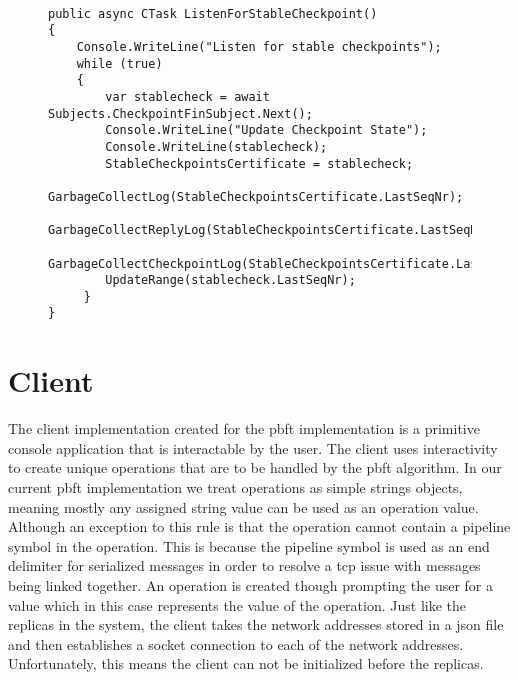 \begin{figure}[H]
	\centering
	\begin{lstlisting}[label = code:ListenForCheckpoint, caption=Listener for valid checkpoint, captionpos = b, basicstyle=\scriptsize]

public async CTask ListenForStableCheckpoint()
{
    Console.WriteLine("Listen for stable checkpoints");
    while (true)
    {
    	var stablecheck = await Subjects.CheckpointFinSubject.Next();
        Console.WriteLine("Update Checkpoint State");
        Console.WriteLine(stablecheck);
        StableCheckpointsCertificate = stablecheck;
        GarbageCollectLog(StableCheckpointsCertificate.LastSeqNr);
        GarbageCollectReplyLog(StableCheckpointsCertificate.LastSeqNr);
        GarbageCollectCheckpointLog(StableCheckpointsCertificate.LastSeqNr);
        UpdateRange(stablecheck.LastSeqNr);
     }
}
    \end{lstlisting}
\end{figure}

\section{Client}
The client implementation created for the \ac{pbft} implementation is a primitive console application that is interactable by the user. The client uses interactivity to create unique operations that are to be handled by the \ac{pbft} algorithm. In our current \ac{pbft} implementation we treat operations as simple strings objects, meaning mostly any assigned string value can be used as an operation value. Although an exception to this rule is that the operation cannot contain a pipeline symbol in the operation. This is because the pipeline symbol is used as an end delimiter for serialized messages in order to resolve a \ac{tcp} issue with messages being linked together. An operation is created though prompting the user for a value which in this case represents the value of the operation. 
Just like the replicas in the system, the client takes the network addresses stored in a \ac{json} file and then establishes a socket connection to each of the network addresses. Unfortunately, this means the client can not be initialized before the replicas.

